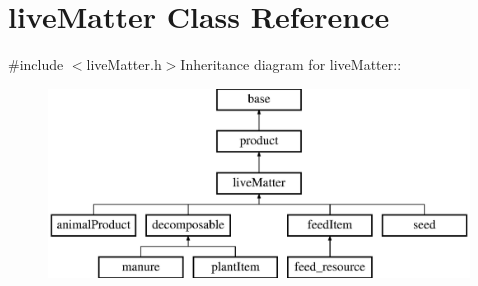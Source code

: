 \hypertarget{classlive_matter}{
\section{liveMatter Class Reference}
\label{classlive_matter}
}


{\ttfamily \#include $<$liveMatter.h$>$}Inheritance diagram for liveMatter::\begin{figure}[H]
\begin{center}
\leavevmode
\includegraphics[height=5cm]{classlive_matter}
\end{center}
\end{figure}
